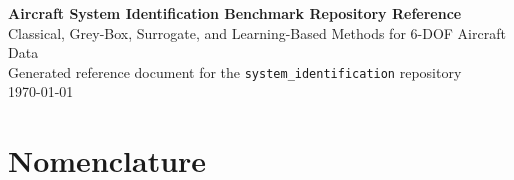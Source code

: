 \documentclass[11pt]{article}
\begin{document}
\begin{center}
{\LARGE\bfseries Aircraft System Identification Benchmark Repository Reference}\\[0.75em]
{\large Classical, Grey-Box, Surrogate, and Learning-Based Methods for 6-DOF Aircraft Data}\\[0.75em]
{\normalsize Generated reference document for the \texttt{system\_identification} repository}\\[0.5em]
{\normalsize \today}
\end{center}
\vspace{1em}

\begin{abstract}
This document is the technical reference for the \texttt{system\_identification}
repository. It defines the benchmark motivation, aircraft models, generated
datasets, measurement assumptions, hidden-control cases, implemented
identification methods, code-to-equation traceability, validation metrics, and
current result summaries. The repository focuses on aircraft system
identification for small fixed-wing vehicles when motion capture may be the
only trusted measurement source. The current benchmark suite is a
nonlinear 6-DOF aircraft tier with nominal-plus-unmodeled aerodynamic
terms, motion-capture-derived observations, multiple synthetic maneuver
families, and two real Sport Cub indoor motion-capture flight datasets. The purpose of this reference is reproducibility:
it should be possible to trace each equation, dataset field, result table, and
figure back to repository code and regenerated artifacts.
\end{abstract}

\tableofcontents
\clearpage

\section*{Nomenclature}
\end{document}
